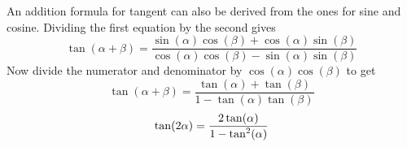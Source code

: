 \documentclass{article}
\begin{document}
An addition formula for tangent can also be derived from the
ones for sine and cosine. Dividing the first equation by the second gives
\[
\tan(\alpha+\beta) = \frac{\sin(\alpha)\cos(\beta) + \cos(\alpha)\sin(\beta)}
                 {\cos(\alpha)\cos(\beta) - \sin(\alpha)\sin(\beta)}
\]
Now divide the numerator and denominator by $\cos(\alpha)\cos(\beta)$ to get
\[
\tan(\alpha+\beta) = \frac{\tan(\alpha) + \tan(\beta)}{1 -
\tan(\alpha)\tan(\beta)}
\]
\[
\tan(2\alpha) = \frac{2\tan(\alpha)}{1-\tan^2(\alpha)} \\
\]




\end{document}
